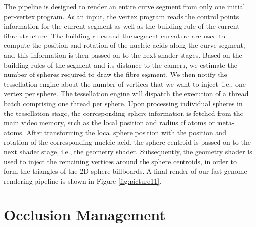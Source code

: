 The pipeline is designed to render an entire curve segment from only one initial per-vertex program.
As an input, the vertex program reads the control points information for the current segment as well as the building rule of the current fibre structure.
The building rules and the segment curvature are used to compute the position and rotation of the nucleic acids along the curve segment, and this information is then passed on to the next shader stages.
Based on the building rules of the segment and its distance to the camera, we estimate the number of spheres required to draw the fibre segment.
We then notify the tessellation engine about the number of vertices that we want to inject, i.e., one vertex per sphere.
The tessellation engine will dispatch the execution of a thread batch comprising one thread per sphere.
Upon processing individual spheres in the tessellation stage, the corresponding sphere information is fetched from the main video memory, such as the local position and radius of atoms or meta-atoms.
After transforming the local sphere position with the position and rotation of the corresponding nucleic acid, the sphere centroid is passed on to the next shader stage, i.e., the geometry shader.
Subsequently, the geometry shader is used to inject the remaining vertices around the sphere centroids, in order to form the triangles of the 2D sphere billboards.
A final render of our fast genome rendering pipeline is shown in Figure \ref{fig:picture11}.

\section{Occlusion Management}


